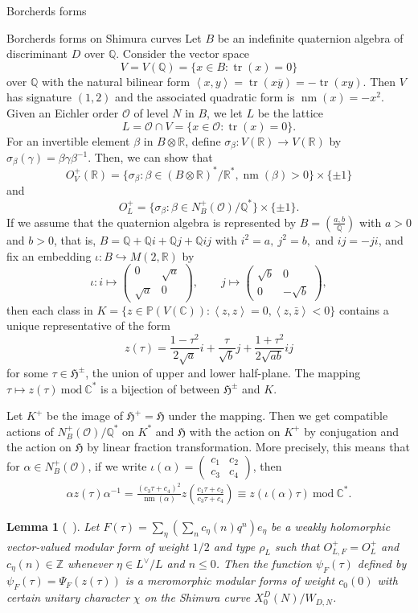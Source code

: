 \documentclass{amsart}
\newcounter{lemma}
\newtheorem{Lemma}[lemma]{Lemma}
\theoremstyle{definition}
\def\H{\mathfrak H}
\def\tr{\operatorname{tr}}
\def\nm{\operatorname{nm}}
\def\C{\mathbb C}
\def\O{\mathcal O}
\def\Q{\mathbb Q}
\def\R{\mathbb R}
\def\Z{\mathbb Z}
\def\mod{\  \mathrm{mod}\ }
\def\M#1#2#3#4{\begin{pmatrix}#1&#2\\#3&#4\end{pmatrix}}
\def\SM#1#2#3#4{\left(\begin{smallmatrix}#1&#2\\#3&#4\end{smallmatrix}
  \right)}
\begin{document}
\begin{section}{Borcherds forms}
\begin{subsection}{Borcherds forms on Shimura curves}
Let $B$ be an indefinite quaternion algebra of discriminant $D$ over
$\Q$. Consider the vector space
$$
  V=V(\Q)=\{x\in B:\tr(x)=0\}
$$
over $\Q$ with the natural bilinear form $\left\langle
  x,y\right\rangle=\tr(x\overline y)=-\tr(xy)$. Then $V$ has signature
$(1,2)$ and the associated quadratic form is $\nm(x)=-x^2$. Given an
Eichler order $\O$ of level $N$ in $B$, we let $L$ be the lattice
$$
  L=\O\cap V=\{x\in \O:\tr(x)=0\}.
$$
For an invertible element $\beta$ in $B\otimes\R$, define
$\sigma_\beta:V(\R)\to V(\R)$ by
$\sigma_\beta(\gamma)=\beta\gamma\beta^{-1}$. Then, we can show that
$$
  O^+_V(\R)=\{\sigma_{\beta}:\beta \in (B\otimes \R)^\ast/{\R}^\ast,
  \nm(\beta)> 0\}\times \{\pm 1\}
$$
and 
$$
  O^+_L=\{\sigma_{\beta}:\beta \in N^+_B(\O )/{\Q}^\ast\}\times \{\pm
  1\}.
$$
If we assume that the quaternion algebra is represented by
$B=(\frac{a,b}{\Q})$ with $a>0$ and $b>0$, that is, $B=\Q+\Q i+\Q j+\Q
ij$ with $i^2=a,\ j^2=b,$ and $ij=-ji$, and fix an embedding
$\iota:B\hookrightarrow M(2,\R)$ by
$$
  \iota: i\longmapsto\M0{\sqrt a}{\sqrt a}0, \qquad
  j\mapsto\M{\sqrt b}00{-\sqrt b},
$$
then each class in $K=\{z\in
\mathbb{P}(V(\C)):\left\langle z,z\right\rangle=0, \left\langle
  z,\bar{z}\right\rangle<0\}$ contains a unique representative of the
form  
$$
  z(\tau)=\frac{1-{\tau}^2}{2\sqrt{a}}i+\frac{\tau}{\sqrt{b}}j
  +\frac{1+{\tau}^2}{2\sqrt{ab}}ij
$$
for some $\tau\in \H^{\pm} $, the union of upper and lower
half-plane. The mapping $\tau \mapsto z(\tau)\mod \C^\ast$ is a
bijection of between $\H^{\pm}$ and $K$.

Let $K^+$ be the image of $\H^+=\H$ under the mapping. Then we get
{compatible} actions of $N_B^+(\O)/\Q^\ast$ on $K^\ast$ and $\H$
with the action on $K^+$ by {conjugation} and the action on $\H$ by
{linear fraction transformation}. More precisely, this means that for
$\alpha\in N_B^+(\O)$, if we write $\iota(\alpha)=\SM{c_1}{c_2}{c_3}{c_4}$, then
\begin{equation}\label{equation: compatibility}
\begin{split}
  \alpha z(\tau)\alpha^{-1}=\frac{(c_3\tau+c_4)^2}{\nm(\alpha)}
  z\left(\frac{c_1\tau+c_2}{c_3\tau+c_4}\right)
  \equiv z(\iota(\alpha)\tau) \mod \C^\ast.
\end{split}
\end{equation}

\begin{Lemma}[{~\cite[Lemma 4]{Yang-CM}}] 
Let $ F(\tau)=\sum_{\eta}\left(
  \sum_{n}c_{\eta}(n)q^{n}\right){e_{\eta}}$ be a weakly holomorphic
vector-valued modular form of weight ${1}/{2}$ and type $\rho_L$ such
that $O^+_{L,F}=O^+_L$ and $c_{\eta}(n)\in \Z$ whenever $\eta\in
L^\vee/L$ and $n\leq 0$. Then the function $\psi_F(\tau)$ defined by
$\psi_F(\tau)=\Psi_F(z(\tau))$ is a meromorphic modular forms of
weight $c_0(0)$ with certain unitary character $\chi$ on the Shimura
curve $X^D_0(N)/W_{D,N}$.
\end{Lemma}


\end{subsection}
\end{section}
\end{document}
